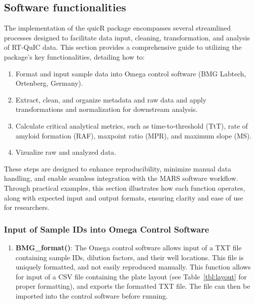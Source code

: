 \documentclass[preprint,12pt, a4paper]{elsarticle}
\begin{document}
\subsection{Software functionalities}
    The implementation of the quicR package encompasses several streamlined processes designed to facilitate data input, cleaning, transformation, and analysis of RT-QuIC data. This section provides a comprehensive guide to utilizing the package's key functionalities, detailing how to:
        
    \begin{enumerate}
        \item Format and input sample data into Omega control software (BMG Labtech, Ortenberg, Germany).
        \item Extract, clean, and organize metadata and raw data and apply transformations and normalization for downstream analysis.
        \item Calculate critical analytical metrics, such as time-to-threshold (TtT), rate of amyloid formation (RAF), maxpoint ratio (MPR), and maximum slope (MS).
        \item Vizualize raw and analyzed data.
    \end{enumerate}

    These steps are designed to enhance reproducibility, minimize manual data handling, and enable seamless integration with the MARS software workflow. Through practical examples, this section illustrates how each function operates, along with expected input and output formats, ensuring clarity and ease of use for researchers.

    \subsubsection{Input of Sample IDs into Omega Control Software}
        \begin{enumerate}
            \item \textbf{BMG\_format()}: The Omega control software allows input of a TXT file containing sample IDs, dilution factors, and their well locations. This file is uniquely formatted, and not easily reproduced manually. This function allows for input of a CSV file containing the plate layout (see Table~\ref{tbl:layout} for proper formatting), and exports the formatted TXT file. The file can then be imported into the control software before running.
        \end{enumerate}
        
\end{document}
